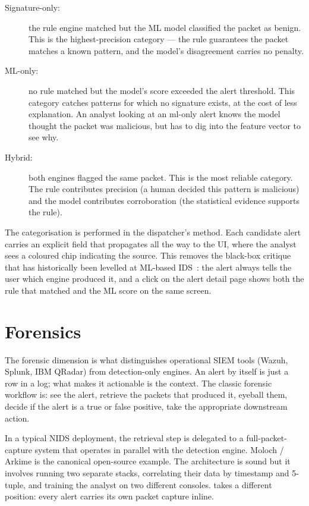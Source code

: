 \begin{description}
  \item[Signature-only:] the rule engine matched but the ML model
    classified the packet as benign. This is the highest-precision
    category --- the rule guarantees the packet matches a known
    pattern, and the model's disagreement carries no penalty.
  \item[ML-only:] no rule matched but the model's score exceeded the
    alert threshold. This category catches patterns for which no
    signature exists, at the cost of less explanation. An analyst
    looking at an ml-only alert knows the model thought the packet
    was malicious, but has to dig into the feature vector to see why.
  \item[Hybrid:] both engines flagged the same packet. This is the
    most reliable category. The rule contributes precision (a human
    decided this pattern is malicious) and the model contributes
    corroboration (the statistical evidence supports the rule).
\end{description}

The categorisation is performed in the dispatcher's
 method. Each candidate alert carries an explicit
 field that propagates all the way to the UI,
where the analyst sees a coloured chip indicating the source. This
removes the black-box critique that has historically been levelled at
ML-based IDS~\cite{sommer2010outside}: the alert always tells the user
which engine produced it, and a click on the alert detail page shows
both the rule that matched and the ML score on the same screen.

\section{Forensics}
\label{sec:bg-forensics}

The forensic dimension is what distinguishes operational SIEM tools
(Wazuh, Splunk, IBM QRadar) from detection-only engines. An alert by
itself is just a row in a log; what makes it actionable is the
context. The classic forensic workflow is: see the alert, retrieve
the packets that produced it, eyeball them, decide if the alert is a
true or false positive, take the appropriate downstream action.

In a typical NIDS deployment, the retrieval step is delegated to a
full-packet-capture system that operates in parallel with the
detection engine. Moloch / Arkime is the canonical open-source
example. The architecture is sound but it involves running two
separate stacks, correlating their data by timestamp and 5-tuple, and
training the analyst on two different consoles. \nidsname{} takes a
different position: every alert carries its own packet capture
inline.

